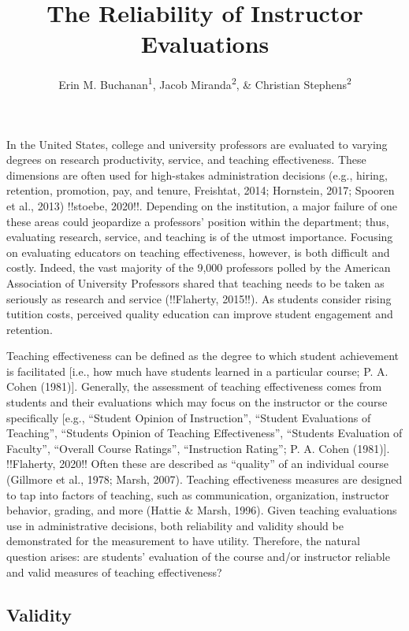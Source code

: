 \documentclass[
  man]{apa7}
\title{The Reliability of Instructor Evaluations}
\author{Erin M. Buchanan\textsuperscript{1}, Jacob Miranda\textsuperscript{2}, \& Christian Stephens\textsuperscript{2}}
\date{}
\affiliation{\vspace{0.5cm}\textsuperscript{1} Harrisburg University of Science and Technology\\\textsuperscript{2} University of Alabama}
\begin{document}
\maketitle

In the United States, college and university professors are evaluated to
varying degrees on research productivity, service, and teaching
effectiveness. These dimensions are often used for high-stakes
administration decisions (e.g., hiring, retention, promotion, pay, and
tenure, Freishtat, 2014; Hornstein, 2017; Spooren et al., 2013) !!stoebe, 2020!!.
Depending on the institution, a major failure of one these areas could
jeopardize a professors' position within the department; thus,
evaluating research, service, and teaching is of the utmost importance.
Focusing on evaluating educators on teaching effectiveness, however, is
both difficult and costly. Indeed, the vast majority of the 9,000
professors polled by the American Association of University Professors
shared that teaching needs to be taken as seriously as research and
service (!!Flaherty, 2015!!). As students consider rising tutition
costs, perceived quality education can improve student engagement and
retention.

Teaching effectiveness can be defined as the degree to which student
achievement is facilitated {[}i.e., how much have students learned in a
particular course; P. A. Cohen (1981){]}. Generally, the assessment of teaching
effectiveness comes from students and their evaluations which may focus
on the instructor or the course specifically {[}e.g., ``Student Opinion of
Instruction'', ``Student Evaluations of Teaching'', ``Students Opinion of
Teaching Effectiveness'', ``Students Evaluation of Faculty'', ``Overall
Course Ratings'', ``Instruction Rating''; P. A. Cohen (1981){]}. !!Flaherty, 2020!!
Often these are described as ``quality'' of an individual course
(Gillmore et al., 1978; Marsh, 2007). Teaching effectiveness measures are
designed to tap into factors of teaching, such as communication,
organization, instructor behavior, grading, and more (Hattie \& Marsh, 1996).
Given teaching evaluations use in administrative decisions, both
reliability and validity should be demonstrated for the measurement to
have utility. Therefore, the natural question arises: are students'
evaluation of the course and/or instructor reliable and valid measures
of teaching effectiveness?

\hypertarget{validity}{%
\subsection{Validity}\label{validity}}
\end{document}
